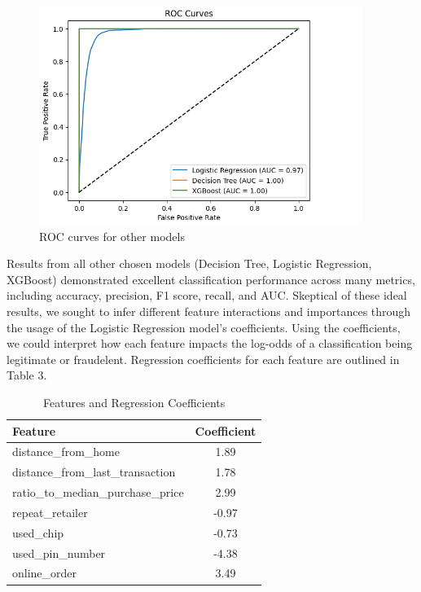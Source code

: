 \documentclass{article}
\begin{document}
\begin{figure}[htbp]
\centering
\includegraphics[width=\linewidth]{image/roc_other_models.png} %
\caption{ROC curves for other models}
\label{fig:my_photo} %
\end{figure}

Results from all other chosen models (Decision Tree, Logistic Regression, XGBoost) demonstrated excellent classification performance across many metrics, including accuracy, precision, F1 score, recall, and AUC. Skeptical of these ideal results, we sought to infer different feature interactions and importances through the usage of the Logistic Regression model's coefficients. Using the coefficients, we could interpret how each feature impacts the log-odds of a classification being legitimate or fraudelent. Regression coefficients for each feature are outlined in Table 3. 

\begin{table}[ht]
\centering

\label{tab:features}
\begin{tabular}{lc}
\toprule
Feature & Coefficient \\
\midrule
distance\_from\_home & 1.89 \\
distance\_from\_last\_transaction & 1.78 \\
ratio\_to\_median\_purchase\_price & 2.99\\
repeat\_retailer & -0.97\\
used\_chip & -0.73\\
used\_pin\_number & -4.38\\
online\_order & 3.49\\
\bottomrule
\end{tabular}
\caption{Features and Regression Coefficients}
\end{table}
\end{document}
